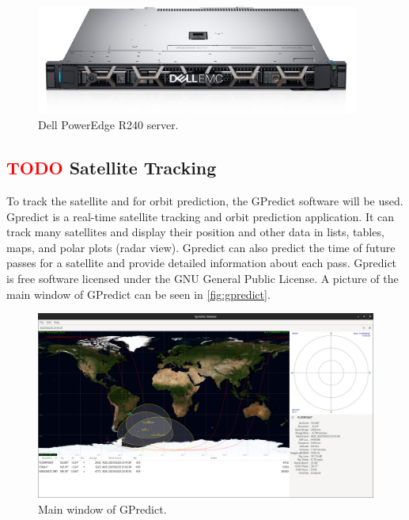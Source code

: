 \begin{figure}[!ht]
    \begin{center}
        \includegraphics[width=300pt]{figures/server.jpg}
        \caption{Dell PowerEdge R240 server.}
        \label{fig:server}
    \end{center}
\end{figure}

\subsection{ \textcolor{red}{TODO} Satellite Tracking}

To track the satellite and for orbit prediction, the GPredict software \cite{gpredict} will be used. Gpredict is a real-time satellite tracking and orbit prediction application. It can track many satellites and display their position and other data in lists, tables, maps, and polar plots (radar view). Gpredict can also predict the time of future passes for a satellite and provide detailed information about each pass. Gpredict is free software licensed under the GNU General Public License. A picture of the main window of GPredict can be seen in \autoref{fig:gpredict}.

\begin{figure}[!ht]
    \begin{center}
        \includegraphics[width=\textwidth]{figures/gpredict.png}
        \caption{Main window of GPredict.}
        \label{fig:gpredict}
    \end{center}
\end{figure}

